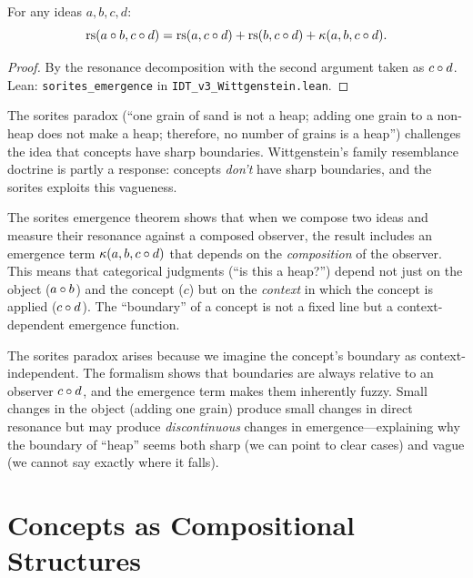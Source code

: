 \begin{theorem}
\label{thm:sorites-emergence}
For any ideas $a, b, c, d$:
\[
\mathrm{rs}(a \circ b, c \circ d) = \mathrm{rs}(a, c \circ d) + \mathrm{rs}(b, c \circ d)
+ \kappa(a, b, c \circ d).
\]
\end{theorem}

\begin{proof}
By the resonance decomposition with the second argument taken as $c \circ d$.
Lean: \texttt{sorites\_emergence} in \texttt{IDT\_v3\_Wittgenstein.lean}.
\end{proof}

\begin{interpretation}
The sorites paradox (``one grain of sand is not a heap; adding one grain to a
non-heap does not make a heap; therefore, no number of grains is a heap'')
challenges the idea that concepts have sharp boundaries. Wittgenstein's family
resemblance doctrine is partly a response: concepts \emph{don't} have sharp
boundaries, and the sorites exploits this vagueness.

The sorites emergence theorem shows that when we compose two ideas and measure
their resonance against a composed observer, the result includes an emergence
term $\kappa(a, b, c \circ d)$ that depends on the \emph{composition} of
the observer. This means that categorical judgments (``is this a heap?'') depend
not just on the object ($a \circ b$) and the concept ($c$) but on the
\emph{context} in which the concept is applied ($c \circ d$). The ``boundary''
of a concept is not a fixed line but a context-dependent emergence function.

The sorites paradox arises because we imagine the concept's boundary as context-
independent. The formalism shows that boundaries are always relative to an
observer $c \circ d$, and the emergence term makes them inherently fuzzy.
Small changes in the object (adding one grain) produce small changes in direct
resonance but may produce \emph{discontinuous} changes in emergence---explaining
why the boundary of ``heap'' seems both sharp (we can point to clear cases) and
vague (we cannot say exactly where it falls).
\end{interpretation}

\section{Concepts as Compositional Structures}

